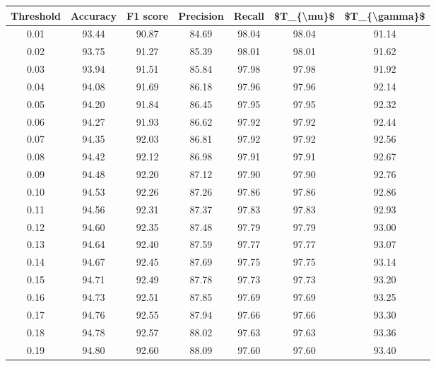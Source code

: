 \begin{tabular}{|c|c|c|c|c|c|c|}
\hline
 Threshold &  Accuracy &  F1 score &  Precision &  Recall &  \$T\_\{\textbackslash mu\}\$ &  \$T\_\{\textbackslash gamma\}\$ \\
\hline
      0.01 &     93.44 &     90.87 &      84.69 &   98.04 &      98.04 &         91.14 \\
      0.02 &     93.75 &     91.27 &      85.39 &   98.01 &      98.01 &         91.62 \\
      0.03 &     93.94 &     91.51 &      85.84 &   97.98 &      97.98 &         91.92 \\
      0.04 &     94.08 &     91.69 &      86.18 &   97.96 &      97.96 &         92.14 \\
      0.05 &     94.20 &     91.84 &      86.45 &   97.95 &      97.95 &         92.32 \\
      0.06 &     94.27 &     91.93 &      86.62 &   97.92 &      97.92 &         92.44 \\
      0.07 &     94.35 &     92.03 &      86.81 &   97.92 &      97.92 &         92.56 \\
      0.08 &     94.42 &     92.12 &      86.98 &   97.91 &      97.91 &         92.67 \\
      0.09 &     94.48 &     92.20 &      87.12 &   97.90 &      97.90 &         92.76 \\
      0.10 &     94.53 &     92.26 &      87.26 &   97.86 &      97.86 &         92.86 \\
      0.11 &     94.56 &     92.31 &      87.37 &   97.83 &      97.83 &         92.93 \\
      0.12 &     94.60 &     92.35 &      87.48 &   97.79 &      97.79 &         93.00 \\
      0.13 &     94.64 &     92.40 &      87.59 &   97.77 &      97.77 &         93.07 \\
      0.14 &     94.67 &     92.45 &      87.69 &   97.75 &      97.75 &         93.14 \\
      0.15 &     94.71 &     92.49 &      87.78 &   97.73 &      97.73 &         93.20 \\
      0.16 &     94.73 &     92.51 &      87.85 &   97.69 &      97.69 &         93.25 \\
      0.17 &     94.76 &     92.55 &      87.94 &   97.66 &      97.66 &         93.30 \\
      0.18 &     94.78 &     92.57 &      88.02 &   97.63 &      97.63 &         93.36 \\
      0.19 &     94.80 &     92.60 &      88.09 &   97.60 &      97.60 &         93.40 \\

\end{tabular}
